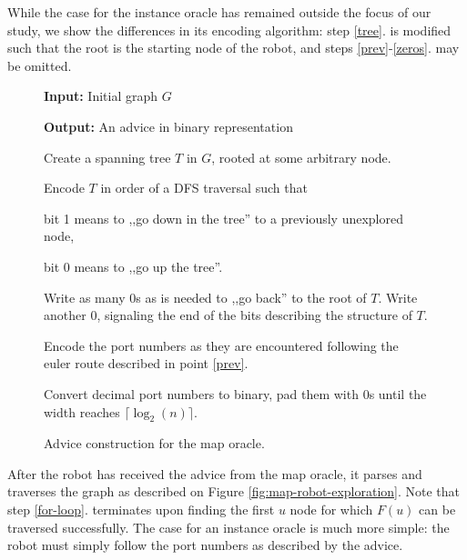 \documentclass{article}
\begin{document}
While the case for the instance oracle has remained outside the focus of our study, we show the differences in its encoding algorithm: step \ref{tree}. is modified such that the root is the starting node of the robot, and steps \ref{prev}-\ref{zeros}. may be omitted.

\begin{figure}
  \textbf{Input:} Initial graph $G$

  \textbf{Output:} An advice in binary representation
  \vspace{1em}

  \begin{compactenum}
  \item \label{tree}Create a spanning tree $T$ in $G$, rooted at some arbitrary node.
  \item \label{prev}Encode $T$ in order of a DFS traversal such that
    \begin{compactenum}
    \item bit 1 means to ,,go down in the tree'' to a previously unexplored node,
    \item bit 0 means to ,,go up the tree''.
    \end{compactenum}
  \item \label{zeros}Write as many 0s as is needed to ,,go back'' to the root of $T$. Write another 0, signaling the end of the bits describing the structure of $T$.
  \item Encode the port numbers as they are encountered following the euler route described in point \ref{prev}.
  \item Convert decimal port numbers to binary, pad them with 0s until the width reaches $\lceil\log_2(n)\rceil$.
  \end{compactenum}
  \caption{Advice construction for the map oracle.}
  \label{fig:encoding-alg}
\end{figure}

After the robot has received the advice from the map oracle, it parses and traverses the graph as described on Figure \ref{fig:map-robot-exploration}. Note that step \ref{for-loop}. terminates upon finding the first $u$ node for which $F(u)$ can be traversed successfully. The case for an instance oracle is much more simple: the robot must simply follow the port numbers as described by the advice.
\end{document}

